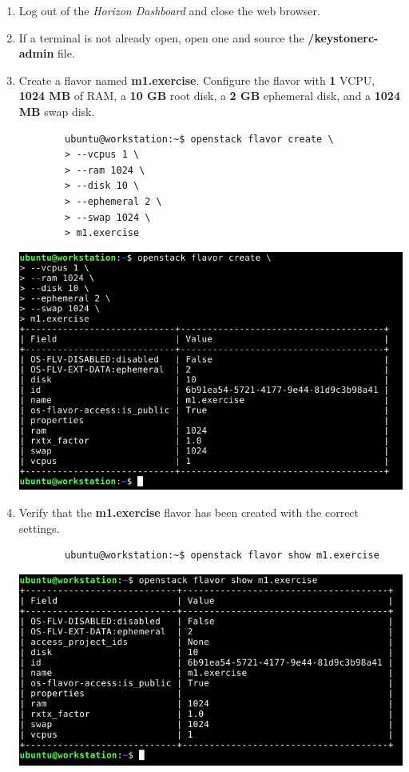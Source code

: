 \documentclass[letterpaper, 12pt]{article}
\begin{document}
\begin{enumerate}
    \item Log out of the \textit{Horizon Dashboard} and close the web browser.
    
    \item If a terminal is not already open, open one and source the \textbf{\texttildemid/keystonerc-admin} file.

    \item Create a flavor named \textbf{m1.exercise}. Configure the flavor with \textbf{1} VCPU, \textbf{1024 MB} of RAM, a
    \textbf{10 GB} root disk, a \textbf{2 GB} ephemeral disk, and a \textbf{1024 MB} swap disk.
    \begin{lstlisting}
        ubuntu@workstation:~$ openstack flavor create \
        > --vcpus 1 \
        > --ram 1024 \
        > --disk 10 \
        > --ephemeral 2 \
        > --swap 1024 \
        > m1.exercise
    \end{lstlisting}

    \begin{center}
        \includegraphics[width=\linewidth]{images/part2/step6.png}
    \end{center}

    \item Verify that the \textbf{m1.exercise} flavor has been created with the correct settings.
    \begin{lstlisting}
        ubuntu@workstation:~$ openstack flavor show m1.exercise
    \end{lstlisting}

    \begin{center}
        \includegraphics[width=\linewidth]{images/part2/step7.png}
    \end{center}


\end{enumerate}
\end{document}
